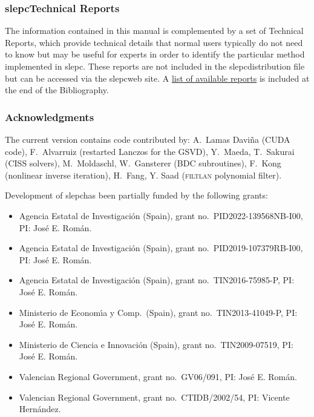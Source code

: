 \documentclass[titlepage,10pt,a4paper]{book}
\newcommand{\packnoi}[1]{{\sc #1}\xspace}
\newcommand{\slepc}{\texorpdfstring{\packnoi{slep\rm c}}{{SLEPc}}}
\begin{document}
{\subsubsection*{\slepc Technical Reports}

	The information contained in this manual is complemented by a set of Technical Reports, which provide technical details that normal users typically do not need to know but may be useful for experts in order to identify the particular method implemented in \slepc. These reports are not included in the \slepc distribution file but can be accessed via the \slepc web site. A \hyperlink{str}{list of available reports} is included at the end of the Bibliography.


\subsubsection*{Acknowledgments}


	The current version contains code contributed by:
A.\ Lamas Davi\~{n}a (CUDA code),
F.\ Alvarruiz (restarted Lanczos for the GSVD),
Y.\ Maeda, T.\ Sakurai (CISS solvers),
M.\ Moldaschl, W.\ Gansterer (BDC subroutines),
F.\ Kong (nonlinear inverse iteration),
H.\ Fang, Y. Saad (\textsc{filtlan} polynomial filter).

	Development of \slepc has been partially funded by the following grants:
\begin{itemize}
\setlength{\itemsep}{-2pt}
\item Agencia Estatal de Investigaci\'on (Spain), grant no.\ PID2022-139568NB-I00, PI: Jos\'e E. Rom\'an.
\item Agencia Estatal de Investigaci\'on (Spain), grant no.\ PID2019-107379RB-I00, PI: Jos\'e E. Rom\'an.
\item Agencia Estatal de Investigaci\'on (Spain), grant no.\ TIN2016-75985-P, PI: Jos\'e E. Rom\'an.
\item Ministerio de Econom\'{\i}a y Comp.\ (Spain), grant no.\ TIN2013-41049-P, PI: Jos\'e E. Rom\'an.
\item Ministerio de Ciencia e Innovaci\'on (Spain), grant no.\ TIN2009-07519, PI: Jos\'e E. Rom\'an.
\item Valencian Regional Government, grant no.\ GV06/091, PI: Jos\'e E. Rom\'an.
\item Valencian Regional Government, grant no.\ CTIDB/2002/54, PI: Vicente Hern\'andez.
\end{itemize}

}
\end{document}
